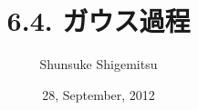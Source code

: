 \documentclass[10pt, a4, serif]{beamer}
\title{6.4. ガウス過程}
\author{Shunsuke Shigemitsu}
\institute{M2 Bilab@UT}
\date{28, September, 2012}
\begin{document}
\frame{\titlepage}








\end{document}
